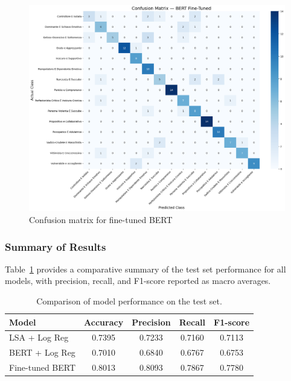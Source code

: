 \documentclass[conference]{IEEEtran}
\begin{document}
\begin{figure}[H]
  \centering
  \includegraphics[width=\columnwidth]{figures/bert_finetuned_confusion_matrix.png}
  \caption{Confusion matrix for fine-tuned BERT}
  \label{fig:bert_cm}
\end{figure}

\vspace{1em}

\subsubsection{Summary of Results}
\noindent

Table~\ref{tab:all_results} provides a comparative summary of the test set performance for all models, with precision, recall, and F1-score reported as macro averages.

\begin{table}[H]
  \centering
  \begin{tabular}{lcccc}
    \toprule
    \textbf{Model} & \textbf{Accuracy} & \textbf{Precision} & \textbf{Recall} & \textbf{F1-score} \\
    \midrule
    LSA + Log Reg & 0.7395 & 0.7233 & 0.7160 & 0.7113 \\
    BERT + Log Reg & 0.7010 & 0.6840 & 0.6767 & 0.6753 \\
    Fine-tuned BERT & 0.8013 & 0.8093 & 0.7867 & 0.7780 \\
    \bottomrule
  \end{tabular}
  \caption{Comparison of model performance on the test set.}
  \label{tab:all_results}
\end{table}
\end{document}
